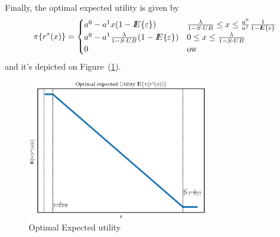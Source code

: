 Finally, the optimal expected utility is given by
\begin{equation}\label{eqEPOpt}
\pi\{r^*(x)\}=\begin{cases}
a^0-a^1x(1-{I\kern-.35em E}\{\varepsilon\})&\frac{\lambda}{1-S\cdot UB}\leq x\leq \frac{a^0}{a^1}\frac{1}{1-{I\kern-.35em E}\{\varepsilon\}}\\
a^0-a^1\frac{\lambda}{1-S\cdot UB}(1-{I\kern-.35em E}\{\varepsilon\})&0\leq x\leq \frac{\lambda}{1-S\cdot UB}\\
0&{\rm ow}
\end{cases}
\end{equation}
and it's depicted on Figure~(\ref{figOpExUt}).

\begin{figure}[htbp] %
   \centering
   \includegraphics[width=0.7\textwidth]{OptExpUt} 
   \caption{Optimal Expected utility}
   \label{figOpExUt}
\end{figure}
